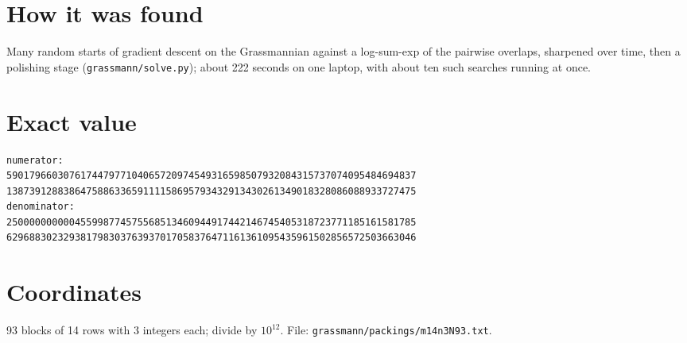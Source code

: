 \documentclass[11pt,a4paper]{article}
\begin{document}
\section{How it was found}
Many random starts of gradient descent on the Grassmannian against a log-sum-exp of the pairwise overlaps, sharpened over time, then a polishing stage (\texttt{grassmann/solve.py}); about 222 seconds on one laptop, with about ten such searches running at once.


\appendix
\section{Exact value}
{\small
\begin{verbatim}
numerator:
590179660307617447977104065720974549316598507932084315737074095484694837
138739128838647588633659111158695793432913430261349018328086088933727475
denominator:
250000000000455998774575568513460944917442146745405318723771185161581785
629688302329381798303763937017058376471161361095435961502856572503663046
\end{verbatim}}

\section{Coordinates}
93 blocks of 14 rows with 3 integers each; divide by $10^{12}$. File: \texttt{grassmann/packings/m14n3N93.txt}.
{\tiny
\begin{multicols}{3}
\end{multicols}}
\end{document}
